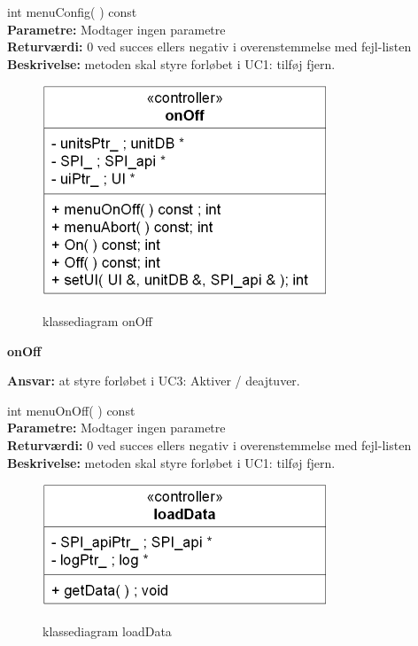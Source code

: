 int menuConfig( ) const \\
\textbf{Parametre:} Modtager ingen parametre \\
\textbf{Returværdi:} 0 ved succes ellers negativ i overenstemmelse med fejl-listen \\
\textbf{Beskrivelse:} metoden skal styre forløbet i UC1: tilføj fjern.\\

\begin{figure}[htbp] \centering
{\includegraphics[scale=1.5]{filer/design/Klassediagrammer/sw_onOff}}
\caption{klassediagram onOff}
\label{fig:onOff klassediagram}
\end{figure} 

\newpage

{\centering
\textbf{onOff}\par
}
\textbf{Ansvar:} at styre forløbet i UC3: Aktiver / deajtuver. \

int menuOnOff( ) const \\
\textbf{Parametre:} Modtager ingen parametre \\
\textbf{Returværdi:} 0 ved succes ellers negativ i overenstemmelse med fejl-listen \\
\textbf{Beskrivelse:} metoden skal styre forløbet i UC1: tilføj fjern.\\

\begin{figure}[htbp] \centering
{\includegraphics[scale=1.5]{filer/design/Klassediagrammer/sw_loadData}}
\caption{klassediagram loadData}
\label{fig:loadData klassediagram}
\end{figure} 


